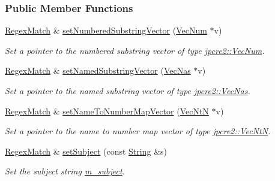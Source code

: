 \subsubsection*{Public Member Functions}
\begin{DoxyCompactItemize}
\item 
\hyperlink{classjpcre2_1_1RegexMatch}{Regex\+Match} \& \hyperlink{classjpcre2_1_1RegexMatch_a2c7efe1ec2e13827f670db4ecedcd0a0}{set\+Numbered\+Substring\+Vector} (\hyperlink{namespacejpcre2_ac1cf752c8fbb0be78020be3b80e77ce3}{Vec\+Num} $\ast$v)
\begin{DoxyCompactList}\small\item\em Set a pointer to the numbered substring vector of type \hyperlink{namespacejpcre2_ac1cf752c8fbb0be78020be3b80e77ce3}{jpcre2\+::\+Vec\+Num}. \end{DoxyCompactList}\item 
\hyperlink{classjpcre2_1_1RegexMatch}{Regex\+Match} \& \hyperlink{classjpcre2_1_1RegexMatch_ae495431f57cae54363331237ab21b56c}{set\+Named\+Substring\+Vector} (\hyperlink{namespacejpcre2_a2b121ae776ea5b2913839f418a7d856b}{Vec\+Nas} $\ast$v)
\begin{DoxyCompactList}\small\item\em Set a pointer to the named substring vector of type \hyperlink{namespacejpcre2_a2b121ae776ea5b2913839f418a7d856b}{jpcre2\+::\+Vec\+Nas}. \end{DoxyCompactList}\item 
\hyperlink{classjpcre2_1_1RegexMatch}{Regex\+Match} \& \hyperlink{classjpcre2_1_1RegexMatch_a04926e61d8b5f1d8bdf344efecd567d8}{set\+Name\+To\+Number\+Map\+Vector} (\hyperlink{namespacejpcre2_a88a7aaf84cad627d34c8152e726168eb}{Vec\+NtN} $\ast$v)
\begin{DoxyCompactList}\small\item\em Set a pointer to the name to number map vector of type \hyperlink{namespacejpcre2_a88a7aaf84cad627d34c8152e726168eb}{jpcre2\+::\+Vec\+NtN}. \end{DoxyCompactList}\item 
\hyperlink{classjpcre2_1_1RegexMatch}{Regex\+Match} \& \hyperlink{classjpcre2_1_1RegexMatch_a635c652195deaa8ebb9e107c4f972aab}{set\+Subject} (const \hyperlink{namespacejpcre2_a91f03070152fb228bc116c5a737f1d16}{String} \&s)
\begin{DoxyCompactList}\small\item\em Set the subject string \hyperlink{classjpcre2_1_1RegexMatch_a9df4f1897e7fa33e05a9f6f938992ca7}{m\+\_\+subject}. \end{DoxyCompactList}\item 

\end{DoxyCompactItemize}
